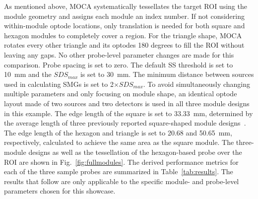 As mentioned above, MOCA systematically tessellates the target ROI using the module geometry and assigns each module an index number. If not considering within-module optode locations, only translation is needed for both square and hexagon modules to completely cover a region. For the triangle shape, MOCA rotates every other triangle and its optodes 180 degrees to fill the ROI without leaving any gaps. No other probe-level parameter changes are made for this comparison. Probe spacing is set to zero. The default SS threshold is set to 10~mm and the $SDS_{max}$ is set to 30~mm. The minimum distance between sources used in calculating SMGs is set to 2$\times SDS_{max}$. To avoid simultaneously changing multiple parameters and only focusing on module shape, an identical optode layout made of two sources and two detectors is used in all three module designs in this example. The edge length of the square is set to 33.33~mm, determined by the average length of three previously reported square-shaped module designs~\cite{Chitnis2016, Bci2017, Zimmermann2013}. The edge length of the hexagon and triangle is set to 20.68 and 50.65~mm, respectively, calculated to achieve the same area as the square module. The three-module designs as well as the tessellation of the hexagon-based probe over the ROI are shown in Fig.~\ref{fig:fullmodules}. The derived performance metrics for each of the three sample probes are summarized in Table~\ref{tab:results}. The results that follow are only applicable to the specific module- and probe-level parameters chosen for this showcase.

